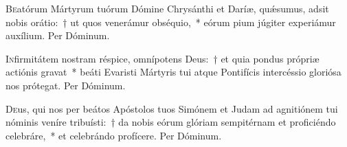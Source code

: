 \documentclass[vesperale_romanum.tex]{subfiles}
\begin{document}


\myrule



\oratio

\lettrine{B}{e}atórum Mártyrum tuórum Dómine Chrysánthi et Daríæ, quǽsumus, adsit nobis orátio:~† ut quos venerámur obséquio,~* eórum pium júgiter experiámur auxílium.
Per Dóminum.

\myrule


\oratio

\lettrine{I}{n}firmitátem nostram réspice, omnípotens Deus:~† et quia pondus própriæ actiónis gravat~* beáti Evaristi Mártyris tui atque Pontifícis intercéssio gloriósa nos prótegat. Per Dóminum.

\myrule



\oratio

\lettrine{D}{e}us, qui nos per beátos Apóstolos tuos Simónem et Judam ad agnitiónem tui nóminis veníre tribuísti:~† da nobis eórum glóriam sempitérnam et proficiéndo celebráre,~* et celebrándo profícere. Per Dóminum.

\myrule
\end{document}
